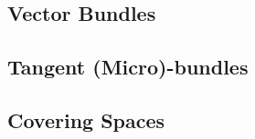 	\begin{definition}
	\end{definition}

	\newpage
	\subsection{Vector Bundles}
	\subsection{Tangent (Micro)-bundles}
	\subsection{Covering Spaces}
